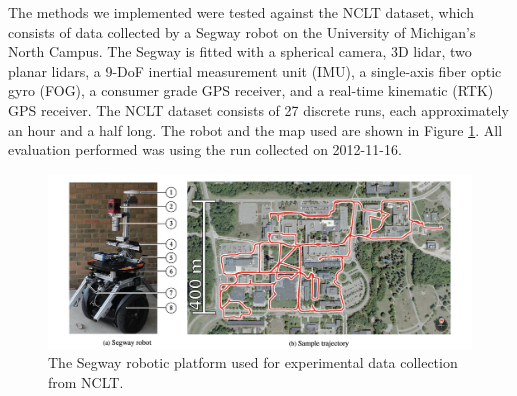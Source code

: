 The methods we implemented were tested against the NCLT dataset, which consists of data collected by a Segway robot on the University of Michigan's North Campus. The Segway is fitted with a spherical camera, 3D lidar, two planar lidars, a 9-DoF inertial measurement unit (IMU), a single-axis fiber optic gyro (FOG), a consumer grade GPS receiver, and a real-time kinematic (RTK) GPS receiver. The NCLT dataset consists of 27 discrete runs, each approximately an hour and a half long. The robot and the map used are shown in Figure \ref{fig:Robot}. All evaluation performed was using the run collected on 2012-11-16.

\begin{figure}
    \centering
    \includegraphics[width=1\columnwidth]{media/Robot_intro.png}
    \caption{The Segway robotic platform used for experimental data collection from NCLT.}
    \label{fig:Robot}
\end{figure}
